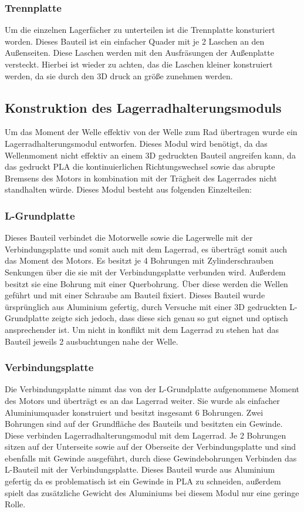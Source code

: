 \subsubsection{Trennplatte}
Um die einzelnen Lagerfächer zu unterteilen ist die Trennplatte konsturiert worden. Dieses Bauteil ist ein einfacher
Quader mit je 2 Laschen an den Außenseiten. Diese Laschen werden mit den Ausfräsungen der Außenplatte versteckt.
Hierbei ist wieder zu achten, das die Laschen kleiner konstruiert werden, da sie durch den 3D druck an größe zunehmen
werden.

\subsection{Konstruktion des Lagerradhalterungsmoduls}
Um das Moment der Welle effektiv von der Welle zum Rad übertragen wurde ein Lagerradhalterungsmodul entworfen. Dieses Modul wird
benötigt, da das Wellenmoment nicht effektiv an einem 3D gedruckten Bauteil angreifen kann, da das gedruckt PLA
die kontinuierlichen Richtungswechsel sowie das abrupte Bremsens des Motors in kombination mit der
Trägheit des Lagerrades nicht standhalten würde. Dieses Modul besteht aus folgenden Einzelteilen:

\subsubsection{L-Grundplatte}
Dieses Bauteil verbindet die Motorwelle sowie die Lagerwelle mit der Verbindungsplatte und somit auch mit dem Lagerrad, es
überträgt somit auch das Moment des Motors. Es besitzt je 4 Bohrungen mit Zylinderschrauben Senkungen über die sie mit
der Verbindungsplatte verbunden wird. Außerdem besitzt sie eine Bohrung mit einer Querbohrung. Über diese werden die
Wellen geführt und mit einer Schraube am Bauteil fixiert.
Dieses Bauteil wurde ürsprünglich aus Aluminium gefertig, durch Versuche mit einer 3D gedruckten L-Grundplatte zeigte
sich jedoch, dass diese sich genau so gut eignet und optisch ansprechender ist. Um nicht in konflikt mit dem Lagerrad
zu stehen hat das Bauteil jeweils 2 ausbuchtungen nahe der Welle.

\subsubsection{Verbindungsplatte}
Die Verbindungsplatte nimmt das von der L-Grundplatte aufgenommene Moment des Motors und überträgt es an das Lagerrad weiter.
Sie wurde als einfacher Aluminiumquader konstruiert und besitzt insgesamt 6 Bohrungen. Zwei Bohrungen sind auf der
Grundfläche des Bauteils und besitzten ein Gewinde. Diese verbinden Lagerradhalterungsmodul mit dem Lagerrad. Je 2
Bohrungen sitzen auf der Unterseite sowie auf der Oberseite der Verbindungsplatte und sind ebenfalls mit Gewinde
ausgeführt, durch diese Gewindebohrungen Verbinden das L-Bauteil mit der Verbindungsplatte.
Dieses Bauteil wurde aus Aluminium gefertig da es problematisch ist ein Gewinde in PLA zu schneiden, außerdem spielt
das zusätzliche Gewicht des Aluminiums bei diesem Modul nur eine geringe Rolle.

